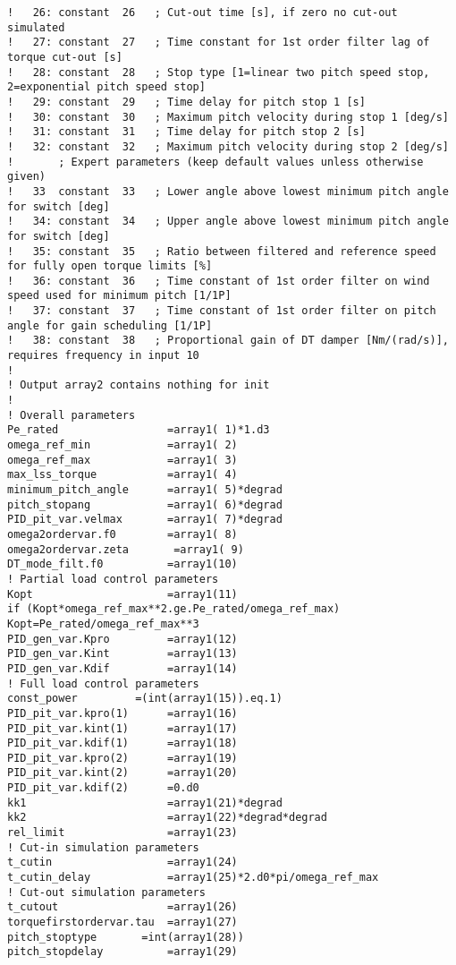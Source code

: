 {\begin{verbatim}
!   26: constant  26   ; Cut-out time [s], if zero no cut-out simulated
!   27: constant  27   ; Time constant for 1st order filter lag of torque cut-out [s]
!   28: constant  28   ; Stop type [1=linear two pitch speed stop, 2=exponential pitch speed stop]
!   29: constant  29   ; Time delay for pitch stop 1 [s]
!   30: constant  30   ; Maximum pitch velocity during stop 1 [deg/s]
!   31: constant  31   ; Time delay for pitch stop 2 [s]
!   32: constant  32   ; Maximum pitch velocity during stop 2 [deg/s]
!       ; Expert parameters (keep default values unless otherwise given)
!   33  constant  33   ; Lower angle above lowest minimum pitch angle for switch [deg]
!   34: constant  34   ; Upper angle above lowest minimum pitch angle for switch [deg]
!   35: constant  35   ; Ratio between filtered and reference speed for fully open torque limits [%]
!   36: constant  36   ; Time constant of 1st order filter on wind speed used for minimum pitch [1/1P]
!   37: constant  37   ; Time constant of 1st order filter on pitch angle for gain scheduling [1/1P]
!  	38: constant  38   ; Proportional gain of DT damper [Nm/(rad/s)], requires frequency in input 10
!
! Output array2 contains nothing for init
!
! Overall parameters
Pe_rated                 =array1( 1)*1.d3
omega_ref_min            =array1( 2)
omega_ref_max            =array1( 3)
max_lss_torque           =array1( 4)
minimum_pitch_angle      =array1( 5)*degrad
pitch_stopang            =array1( 6)*degrad
PID_pit_var.velmax       =array1( 7)*degrad
omega2ordervar.f0        =array1( 8)
omega2ordervar.zeta       =array1( 9)
DT_mode_filt.f0          =array1(10)
! Partial load control parameters
Kopt                     =array1(11)
if (Kopt*omega_ref_max**2.ge.Pe_rated/omega_ref_max) Kopt=Pe_rated/omega_ref_max**3
PID_gen_var.Kpro         =array1(12)
PID_gen_var.Kint         =array1(13)
PID_gen_var.Kdif         =array1(14)
! Full load control parameters
const_power         =(int(array1(15)).eq.1)
PID_pit_var.kpro(1)      =array1(16)
PID_pit_var.kint(1)      =array1(17)
PID_pit_var.kdif(1)      =array1(18)
PID_pit_var.kpro(2)      =array1(19)
PID_pit_var.kint(2)      =array1(20)
PID_pit_var.kdif(2)      =0.d0
kk1                      =array1(21)*degrad
kk2                      =array1(22)*degrad*degrad
rel_limit                =array1(23)
! Cut-in simulation parameters
t_cutin                  =array1(24)
t_cutin_delay            =array1(25)*2.d0*pi/omega_ref_max
! Cut-out simulation parameters
t_cutout                 =array1(26)
torquefirstordervar.tau  =array1(27)
pitch_stoptype       =int(array1(28))
pitch_stopdelay          =array1(29)

\end{verbatim}}
